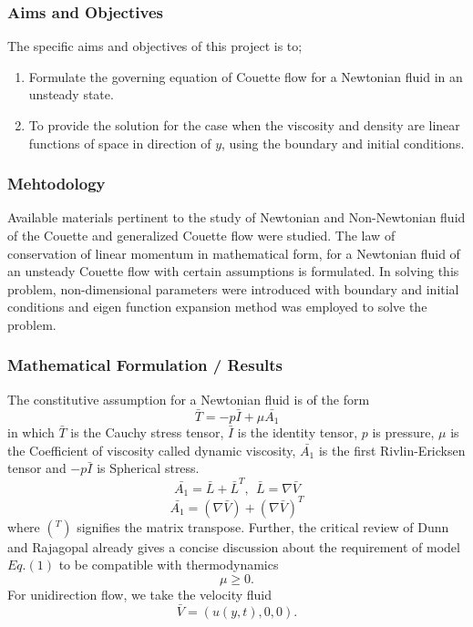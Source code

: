 \documentclass[10pt]{beamer}
\begin{document}
		
		\begin{frame}
			\frametitle{\textbf{Aims and Objectives}}
			The specific aims and objectives of this project is to;
				\begin{enumerate}
				\item Formulate the governing equation of Couette flow for a Newtonian fluid in an unsteady state.
				\item To provide the solution for the case when the viscosity and density are linear functions of space in direction of $ y $, using the boundary and initial conditions.
				\end{enumerate}
	
		\end{frame}
		
		
			\begin{frame}
				\frametitle{\textbf{Mehtodology}}
				Available materials pertinent to the study of Newtonian and Non-Newtonian fluid of the Couette and generalized Couette flow were studied.
				The law of conservation of linear momentum in mathematical form, for a Newtonian fluid of an unsteady Couette flow with certain assumptions is formulated.
				In solving this problem, non-dimensional parameters were introduced with boundary and initial conditions and eigen function expansion method was employed to solve the problem.
				
				
			\end{frame}
		
		\begin{frame}
			\frametitle{\textbf{Mathematical Formulation / Results}}
			The constitutive assumption for a Newtonian fluid is of the form
			\begin{equation}
			\bar{T} = -p \bar{I} + \mu \bar{A_1}
			\end{equation}
			in which $ \bar{T} $ is the Cauchy stress tensor, $ \bar{I} $ is the identity tensor, $ p $ is pressure, $ \mu $ is the Coefficient of viscosity called dynamic viscosity, $ \bar{A_1} $ is the first Rivlin-Ericksen tensor and $ -p\bar{I} $ is Spherical stress.\\
			$$ \bar{A_1} = \bar{L} + \bar{L}^T, ~~ \bar{L} = \nabla\bar{V} $$
			\begin{equation}
			\bar{A_1} = (\nabla\bar{V}) + (\nabla\bar{V})^T
			\end{equation} 
			where $ (^T) $ signifies the matrix transpose. Further, the critical review of Dunn and Rajagopal already gives a concise discussion about the requirement of model $ Eq. (1) $ to be compatible with thermodynamics
		\begin{equation}
		\mu \geq 0.
		\end{equation}
		For unidirection flow, we take the velocity fluid
		\begin{equation}
		\bar{V} = ( u(y ,t), 0, 0 ).
		\end{equation}
			
		\end{frame}
		
\end{document}

